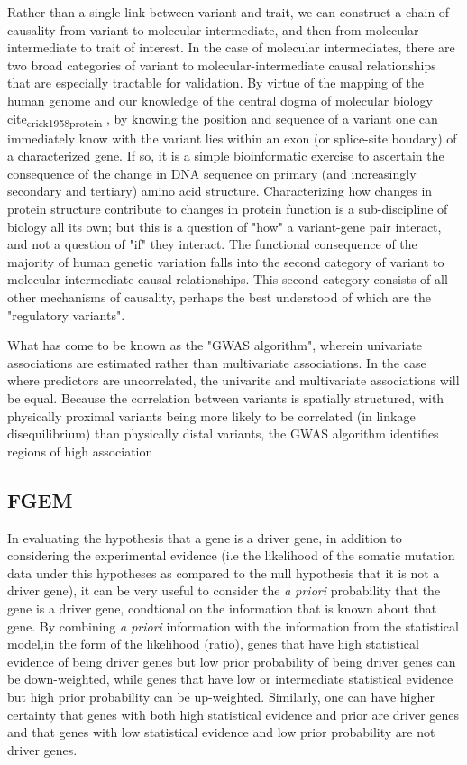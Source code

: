 Rather than a single link between variant and trait, we can construct a chain of causality from variant to molecular intermediate, and then from molecular intermediate to trait
of interest.  In the case of molecular intermediates, there are two broad categories of variant to molecular-intermediate causal relationships that are especially tractable for 
validation.  By virtue of the mapping of the human genome and our knowledge of the central dogma of molecular biology cite\textsubscript{crick1958protein} , by knowing the position and sequence
of a variant one can immediately know with the variant lies within an exon (or splice-site boudary) of a characterized gene.  If so, it is a simple bioinformatic exercise to 
ascertain the consequence of the change in DNA sequence on primary (and increasingly secondary and tertiary) amino acid structure.  Characterizing how changes in protein
structure contribute to changes in protein function is a sub-discipline of biology all its own; but this is a question of "how" a variant-gene pair interact, and not a question of 
"if" they interact.  The functional consequence of the majority of human genetic variation falls into the second category of variant to molecular-intermediate causal relationships.  
This second category consists of all other mechanisms of causality, perhaps the best understood of which are the "regulatory variants".

What has come to be known as the "GWAS algorithm", wherein univariate associations are estimated rather than multivariate associations.
In the case where predictors are uncorrelated, the univarite and multivariate associations will be equal.  Because the correlation between variants is 
spatially structured, with physically proximal variants being more likely to be correlated (in linkage disequilibrium) than physically distal variants, 
the GWAS algorithm identifies regions of high association



\subsection{FGEM}


In evaluating the hypothesis that a gene is a driver gene, in addition to considering the experimental evidence (i.e the likelihood of the somatic mutation data under this hypotheses as compared to the null hypothesis that it is not a driver gene), it can be very useful to consider the \emph{a priori} probability that the gene is a driver gene, condtional on the information that is known about that gene.  By combining \emph{a priori} information with the information from the statistical model,in the form of the likelihood (ratio), genes that have high statistical evidence of being driver genes but low prior probability of being driver genes can be down-weighted, while genes that have low or intermediate statistical evidence but high prior probability can be up-weighted.  Similarly, one can have higher certainty that genes with  both high statistical evidence and prior are driver genes and that genes with low statistical evidence and low prior probability are not driver genes.

